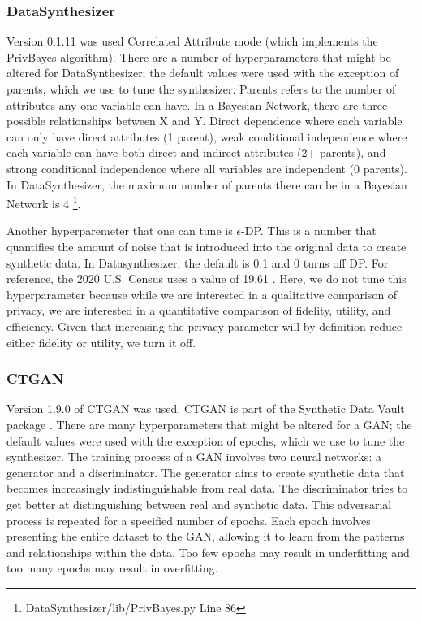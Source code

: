 \documentclass[runningheads]{llncs}
\begin{document}
\subsubsection{DataSynthesizer} Version 0.1.11 \cite{ping2017datasynthesizer} was used Correlated Attribute mode (which implements the PrivBayes \cite{zhang2017privbayes} algorithm).  There are a number of hyperparameters that might be altered for DataSynthesizer; the default values were used with the exception of parents, which we use to tune the synthesizer.  Parents refers to the number of attributes any one variable can have.  In a Bayesian Network, there are three possible relationships between X and Y.  Direct dependence where each variable can only have direct attributes (1 parent), weak conditional independence where each variable can have both direct and indirect attributes (2+ parents), and strong conditional independence where all variables are independent (0 parents).  In DataSynthesizer, the maximum number of parents there can be in a Bayesian Network is 4 \footnote{DataSynthesizer/lib/PrivBayes.py Line 86}.

Another hyperparemeter that one can tune is $\epsilon$-DP. This is a number that quantifies the amount of noise that is introduced into the original data to create synthetic data.  In Datasynthesizer, the default is 0.1 and 0 turns off DP.  For reference, the 2020 U.S. Census uses a value of 19.61 \cite{kenny2021use}.  Here, we do not tune this hyperparameter because while we are interested in a qualitative comparison of privacy, we are interested in a quantitative comparison of fidelity, utility, and efficiency.  Given that increasing the privacy parameter will by definition reduce either fidelity or utility, we turn it off.

\subsubsection{CTGAN} Version 1.9.0 of CTGAN was used.  CTGAN \cite{ctgan} is part of the Synthetic Data Vault package \cite{patki2016synthetic}.  There are many hyperparameters that might be altered for a GAN; the default values were used with the exception of epochs, which we use to tune the synthesizer.  The training process of a GAN involves two neural networks: a generator and a discriminator. The generator aims to create synthetic data that becomes increasingly indistinguishable from real data.  The discriminator tries to get better at distinguishing between real and synthetic data. This adversarial process is repeated for a specified number of epochs.  Each epoch involves presenting the entire dataset to the GAN, allowing it to learn from the patterns and relationships within the data. Too few epochs may result in underfitting and too many epochs may result in overfitting.
\end{document}
